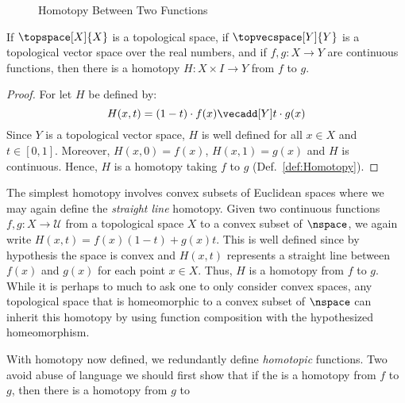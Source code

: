 \documentclass{article}                                                        %
\begin{document}
        \begin{figure}[H]
            \centering
            \captionsetup{type=figure}
            
            \caption{Homotopy Between Two Functions}
            \label{fig:Homotopy_Diagram_for_Depicting_Homotopy}
        \end{figure}
        \begin{theorem}
            If $\topspace[X]{X}$ is a topological space, if $\topvecspace[Y]{Y}$
            is a topological vector space over the real numbers, and if
            $f,g:X\rightarrow{Y}$ are continuous functions, then there is a
            homotopy $H:X\times{I}\rightarrow{Y}$ from $f$ to $g$.
        \end{theorem}
        \begin{proof}
            For let $H$ be defined by:
            \begin{equation}
                H(x,t)=(1-t)\cdot{f}(x)\vecadd[Y]t\cdot{g}(x)
            \end{equation}
            Since $Y$ is a topological vector space, $H$ is well defined for all
            $x\in{X}$ and $t\in[0,1]$. Moreover, $H(x,0)=f(x)$, $H(x,1)=g(x)$
            and $H$ is continuous. Hence, $H$ is a homotopy taking $f$ to $g$
            (Def.~\ref{def:Homotopy}).
        \end{proof}
        \begin{example}
            The simplest homotopy involves convex subsets of Euclidean spaces
            where we may again define the \textit{straight line} homotopy. Given
            two continuous functions $f,g:X\rightarrow\mathcal{U}$ from a
            topological space $X$ to a convex subset of $\nspace$, we again
            write $H(x,t)=f(x)(1-t)+g(x)t$. This is well defined since by
            hypothesis the space is convex and $H(x,t)$ represents a straight
            line between $f(x)$ and $g(x)$ for each point $x\in{X}$. Thus, $H$
            is a homotopy from $f$ to $g$. While it is perhaps to much to ask
            one to only consider convex spaces, any topological space that is
            homeomorphic to a convex subset of $\nspace$ can inherit this
            homotopy by using function composition with the hypothesized
            homeomorphism.
        \end{example}
        With homotopy now defined, we redundantly define \textit{homotopic}
        functions. Two avoid abuse of language we should first show that if
        the is a homotopy from $f$ to $g$, then there is a homotopy from $g$ to
\end{document}
